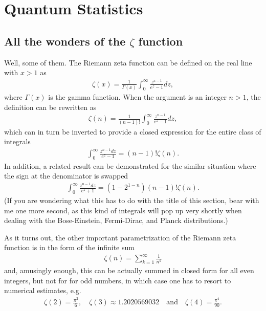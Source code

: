 \chapter{Quantum Statistics}
\label{chap:qstat}



\section{All the wonders of the $\zeta$ function}
\label{sec:riemann_zeta}

Well, some of them. The Riemann zeta function can be defined on the real line with
$x > 1$ as
\begin{align}
  \zeta(x) = \frac{1}{\Gamma(x)} \int_0^\infty \frac{z^{x-1}}{e^z - 1} dz,
\end{align}
where $\Gamma(x)$ is the gamma function. When the argument is an integer $n > 1$,
the definition can be rewritten as
\begin{align*}
  \zeta(n) = \frac{1}{(n - 1)!} \int_0^\infty \frac{z^{n-1}}{e^z - 1} dz,
\end{align*}
which can in turn be inverted to provide a closed expression for the entire class
of integrals
\begin{align}
  \int_0^\infty \frac{z^{n-1} dz}{e^z - 1} = (n - 1)! \zeta(n).
\end{align}
In addition, a related result can be demonstrated for the similar situation where
the sign at the denominator is swapped
\begin{align}
  \int_0^\infty \frac{z^{n-1} dz}{e^z + 1} = (1 - 2^{1 - n}) (n - 1)! \zeta(n).
\end{align}
(If you are wondering what this has to do with the title of this section, bear with
me one more second, as this kind of integrals will pop up very shortly when
dealing with the Bose-Einstein, Fermi-Dirac, and Planck distributions.)

As it turns out, the other important parametrization of the Riemann zeta function
is in the form of the infinite sum
\begin{align*}
  \zeta(n) = \sum_{k=1}^\infty \frac{1}{n^k}
\end{align*}
and, amusingly enough, this can be actually summed in closed form for all even
integers, but not for for odd numbers, in which case one has to resort to
numerical estimates, e.g.
\begin{align*}
  \zeta(2) = \frac{\pi^2}{6}, \quad \zeta(3) \approx 1.2020569032
  \quad \text{and} \quad \zeta(4) = \frac{\pi^4}{90}.
\end{align*}

